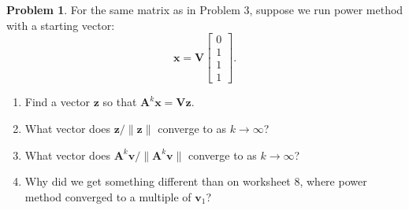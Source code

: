 \documentclass[12pt]{article}
\theoremstyle{definition}
\newtheorem{problem}{Problem}
\renewcommand{\vec}{\mathbf}
\begin{document}
\begin{problem}
For the same matrix as in Problem 3, suppose we run power method with a starting vector:
\[
\vec{x} = \vec{V}\begin{bmatrix}0\\1\\1\\1\end{bmatrix}.
\]

    \begin{enumerate}
        \item Find a vector $\vec{z}$ so that $\vec{A}^k \vec{x} = \vec{V} \vec{z}$.
        
        \item What vector does $\vec{z} / \|\vec{z}\|$ converge to as $k\to\infty$?

        \item What vector does $\vec{A}^k\vec{v} / \|\vec{A}^k\vec{v}\|$ converge to as $k\to\infty$?

        \item Why did we get something different than on worksheet 8, where power method converged to a multiple of $\vec{v}_1$?
    
    \end{enumerate}
\end{problem}
\end{document}
